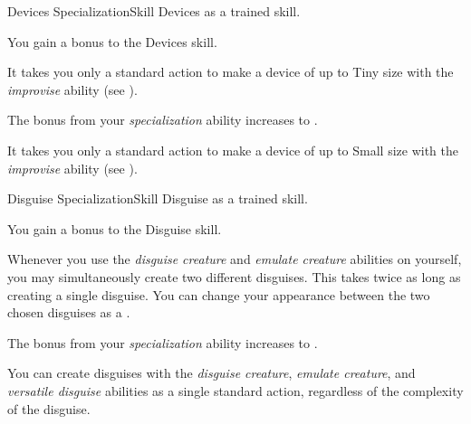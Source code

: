     \begin{feat}{Devices Specialization}{Skill}
        \featpre Devices as a trained skill.

         You gain a  bonus to the Devices skill.

         It takes you only a standard action to make a device of up to Tiny size with the \textit{improvise} ability (see ).

         The bonus from your \textit{specialization} ability increases to .

         It takes you only a standard action to make a device of up to Small size with the \textit{improvise} ability (see ).
    \end{feat}

    \begin{feat}{Disguise Specialization}{Skill}
        \featpre Disguise as a trained skill.

         You gain a  bonus to the Disguise skill.

         Whenever you use the \textit{disguise creature} and \textit{emulate creature} abilities on yourself, you may simultaneously create two different disguises.
        This takes twice as long as creating a single disguise.
        You can change your appearance between the two chosen disguises as a .

         The bonus from your \textit{specialization} ability increases to .

         You can create disguises with the \textit{disguise creature}, \textit{emulate creature}, and \textit{versatile disguise} abilities as a single standard action, regardless of the complexity of the disguise.
    \end{feat}

